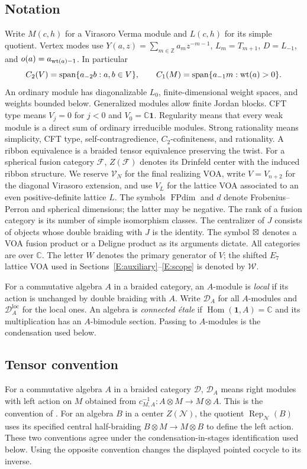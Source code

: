 \documentclass[11pt]{article}
\newcommand{\C}{\mathbb C}\newcommand{\Q}{\mathbb Q}\newcommand{\Z}{\mathbb Z}
\newcommand{\one}{\mathbf1}\newcommand{\D}{\mathcal D}\newcommand{\Dcat}{\mathcal D}
\newcommand{\Ncat}{\mathcal N}\newcommand{\Pcat}{\mathcal P}\newcommand{\Fcat}{\mathcal F}
\newcommand{\FP}{\operatorname{FPdim}}\newcommand{\Irr}{\operatorname{Irr}}
\newcommand{\Hom}{\operatorname{Hom}}\newcommand{\id}{\operatorname{id}}
\numberwithin{equation}{section}
\begin{document}
\subsection{Notation}
Write $M(c,h)$ for a Virasoro Verma module and $L(c,h)$ for its simple quotient. Vertex modes use $Y(a,z)=\sum_{m\in\Z}a_mz^{-m-1}$, $L_m=T_{m+1}$, $D=L_{-1}$, and $o(a)=a_{\operatorname{wt}(a)-1}$. In particular
\[
C_2(V)=\operatorname{span}\{a_{-2}b:a,b\in V\},\qquad
C_1(M)=\operatorname{span}\{a_{-1}m:\operatorname{wt}(a)>0\}.
\]
An ordinary module has diagonalizable $L_0$, finite-dimensional weight spaces, and weights bounded below. Generalized modules allow finite Jordan blocks. CFT type means $V_j=0$ for $j<0$ and $V_0=\C\one$. Regularity means that every weak module is a direct sum of ordinary irreducible modules. Strong rationality means simplicity, CFT type, self-contragredience, $C_2$-cofiniteness, and rationality. A ribbon equivalence is a braided tensor equivalence preserving the twist. For a spherical fusion category $\mathcal F$, $Z(\mathcal F)$ denotes its Drinfeld center with the induced ribbon structure.
We reserve $\mathscr{V}_N$ for the final realizing VOA, write $V=V_{n+2}$ for the diagonal Virasoro extension, and use $V_L$ for the lattice VOA associated to an even positive-definite lattice $L$.
The symbols $\FP$ and $d$ denote Frobenius--Perron and spherical dimensions; the latter may be negative. The rank of a fusion category is its number of simple isomorphism classes. The centralizer of $J$ consists of objects whose double braiding with $J$ is the identity. The symbol $\boxtimes$ denotes a VOA fusion product or a Deligne product as its arguments dictate. All categories are over $\C$. The letter $W$ denotes the primary generator of $V$; the shifted $E_7$ lattice VOA used in Sections~\ref{E:auxiliary}--\ref{E:scope} is denoted by $\mathcal W$.

For a commutative algebra $A$ in a braided category, an $A$-module is \emph{local} if its action is unchanged by double braiding with $A$. Write $\D_A$ for all $A$-modules and $\D_A^{\mathrm{loc}}$ for the local ones. An algebra is \emph{connected \'etale} if $\Hom(\one,A)=\C$ and its multiplication has an $A$-bimodule section. Passing to $A$-modules is the condensation used below.

\subsection{Tensor convention}\label{sec:tensorconvention}
For a commutative algebra $A$ in a braided category $\D$, $\D_A$ means right modules with left action on $M$ obtained from $c^{-1}_{M,A}:A\otimes M\to M\otimes A$. This is the convention of \cite[Section 3.3]{A:DMNO}. For an algebra $B$ in a center $Z(\Ncat)$, the quotient $\operatorname{Rep}_{\Ncat}(B)$ uses its specified central half-braiding $B\otimes M\to M\otimes B$ to define the left action. These two conventions agree under the condensation-in-stages identification used below. Using the opposite convention changes the displayed pointed cocycle to its inverse.
\end{document}
